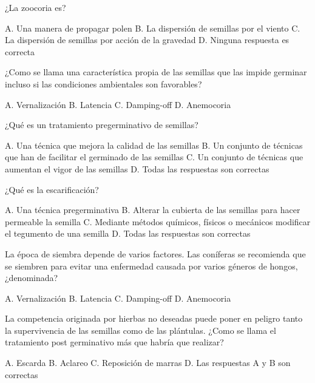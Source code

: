 \documentclass[11pt]{exam}
\begin{document}
{\begin{questions}
\begin{checkboxes}
  \end{checkboxes}
\question ¿La zoocoria es?
  \begin{checkboxes}
    \choice A. Una manera de propagar polen
    \choice B. La dispersión de semillas por el viento
    \choice C. La dispersión de semillas por acción de la gravedad
    \CorrectChoice D. Ninguna respuesta es correcta 
  \end{checkboxes}
\question ¿Como se llama una característica propia de las semillas que las impide germinar
  incluso si las condiciones ambientales son favorables?
  \begin{checkboxes}
    \choice A. Vernalización
    \CorrectChoice B. Latencia
    \choice C. Damping-off
    \choice D. Anemocoria
  \end{checkboxes}
\question ¿Qué es un tratamiento pregerminativo de semillas?
  \begin{checkboxes}
    \choice A. Una técnica que mejora la calidad de las semillas
    \CorrectChoice B. Un conjunto de técnicas que han de facilitar el germinado de las
    semillas
    \choice C. Un conjunto de técnicas que aumentan el vigor de las semillas
    \choice D. Todas las respuestas son correctas
  \end{checkboxes}
\question ¿Qué es la escarificación?
  \begin{checkboxes}
    \choice A. Una técnica pregerminativa
    \choice B. Alterar la cubierta de las semillas para hacer permeable la semilla
    \choice C. Mediante métodos químicos, físicos o mecánicos modificar el tegumento de
    una semilla
    \CorrectChoice D. Todas las respuestas son correctas 
  \end{checkboxes}
\question La época de siembra depende de varios factores. Las coníferas se recomienda que
  se siembren para evitar una enfermedad causada por varios géneros de hongos, ¿denominada?
  \begin{checkboxes}
    \choice A. Vernalización
    \choice B. Latencia
    \CorrectChoice C. Damping-off
    \choice D. Anemocoria    
  \end{checkboxes}
  \newpage
\question La competencia originada por hierbas no deseadas puede poner en peligro tanto la
  supervivencia de las semillas como de las plántulas. ¿Como se llama el tratamiento post
  germinativo más que habría que realizar?
  \begin{checkboxes}
    \CorrectChoice A. Escarda
    \choice B. Aclareo
    \choice C. Reposición de marras
    \choice D. Las respuestas A y B son correctas

\end{checkboxes}
\end{questions}}
\end{document}
